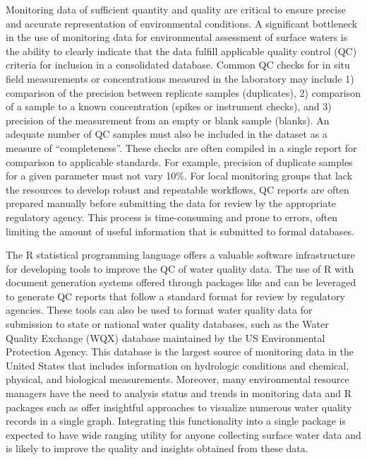 Monitoring data of sufficient quantity and quality are critical to ensure precise and accurate representation of environmental conditions. A significant bottleneck in the use of monitoring data for environmental assessment of surface waters is the ability to clearly indicate that the data fulfill applicable quality control (QC) criteria for inclusion in a consolidated database. Common QC checks for in situ field measurements or concentrations measured in the laboratory may include 1) comparison of the precision between replicate samples (duplicates), 2) comparison of a sample to a known concentration (spikes or instrument checks), and 3) precision of the measurement from an empty or blank sample (blanks). An adequate number of QC samples must also be included in the dataset as a measure of ``completeness''. These checks are often compiled in a single report for comparison to applicable standards. For example, precision of duplicate samples for a given parameter must not vary 10\%. For local monitoring groups that lack the resources to develop robust and repeatable workflows, QC reports are often prepared manually before submitting the data for review by the appropriate regulatory agency. This process is time-consuming and prone to errors, often limiting the amount of useful information that is submitted to formal databases.

The R statistical programming language offers a valuable software infrastructure for developing tools to improve the QC of water quality data. The use of R with document generation systems offered through packages like  and  can be leveraged to generate QC reports that follow a standard format for review by regulatory agencies. These tools can also be used to format water quality data for submission to state or national water quality databases, such as the Water Quality Exchange (WQX) database maintained by the US Environmental Protection Agency. This database is the largest source of monitoring data in the United States that includes information on hydrologic conditions and chemical, physical, and biological measurements. Moreover, many environmental resource managers have the need to analysis status and trends in monitoring data and R packages such as  offer insightful approaches to visualize numerous water quality records in a single graph. Integrating this functionality into a single package is expected to have wide ranging utility for anyone collecting surface water data and is likely to improve the quality and insights obtained from these data.

